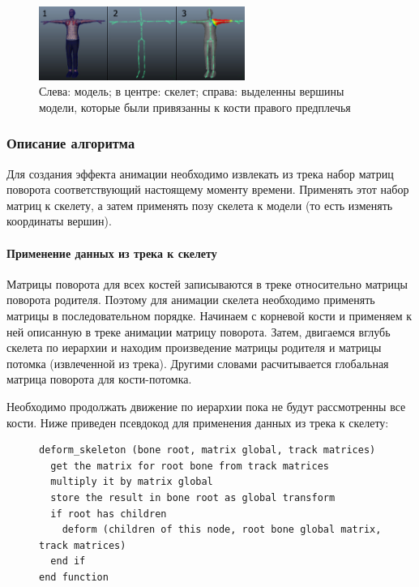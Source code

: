 \begin{figure}[h!]
    \centering
    \includegraphics[width=0.6\textwidth]{skinning.png}
    \caption{\small{Слева: модель; в центре: скелет; справа: выделенны вершины модели, которые были привязанны к кости правого предплечья}}
\end{figure}

\subsubsection{Описание алгоритма}
Для создания эффекта анимации необходимо извлекать из трека набор матриц поворота соответствующий настоящему моменту времени. Применять этот набор матриц к скелету, а затем применять позу скелета к модели (то есть изменять координаты вершин).

\paragraph{Применение данных из трека к скелету}
Матрицы поворота для всех костей записываются в треке относительно матрицы поворота родителя.
Поэтому для анимации скелета необходимо применять матрицы в последовательном порядке.
Начинаем с корневой кости и применяем к ней описанную в треке анимации матрицу поворота.
Затем, двигаемся вглубь скелета по иерархии и находим произведение матрицы родителя и матрицы потомка (извлеченной из трека). Другими словами расчитывается глобальная матрица поворота для кости-потомка.

Необходимо продолжать движение по иерархии пока не будут рассмотренны все кости. Ниже приведен псевдокод для применения данных из трека к скелету:

\begin{figure}[h!]
\begin{small}
\begin{verbatim}
deform_skeleton (bone root, matrix global, track matrices)
  get the matrix for root bone from track matrices
  multiply it by matrix global
  store the result in bone root as global transform
  if root has children
    deform (children of this node, root bone global matrix, track matrices)
  end if
end function
\end{verbatim}
\end{small}
\end{figure}

